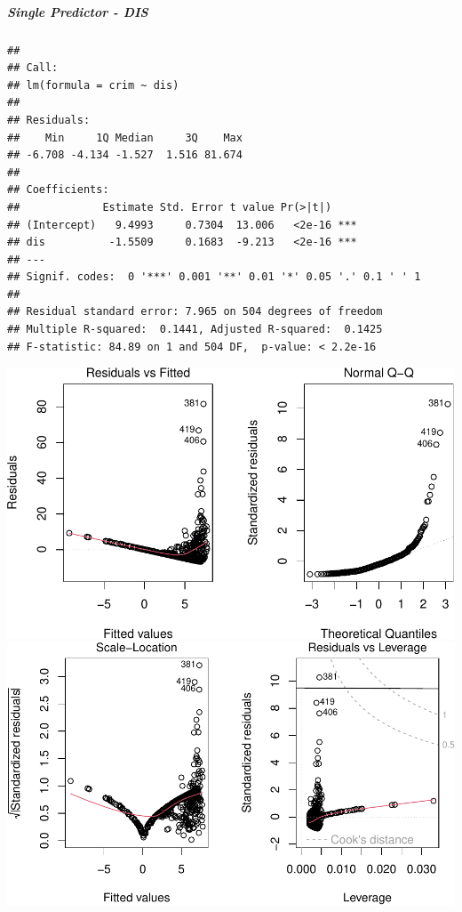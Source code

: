 \documentclass[
]{article}
\begin{document}
\hypertarget{single-predictor---dis}{%
\subparagraph{\texorpdfstring{\textbf{Single Predictor -
DIS}}{Single Predictor - DIS}}\label{single-predictor---dis}}

\begin{verbatim}
## 
## Call:
## lm(formula = crim ~ dis)
## 
## Residuals:
##    Min     1Q Median     3Q    Max 
## -6.708 -4.134 -1.527  1.516 81.674 
## 
## Coefficients:
##             Estimate Std. Error t value Pr(>|t|)    
## (Intercept)   9.4993     0.7304  13.006   <2e-16 ***
## dis          -1.5509     0.1683  -9.213   <2e-16 ***
## ---
## Signif. codes:  0 '***' 0.001 '**' 0.01 '*' 0.05 '.' 0.1 ' ' 1
## 
## Residual standard error: 7.965 on 504 degrees of freedom
## Multiple R-squared:  0.1441, Adjusted R-squared:  0.1425 
## F-statistic: 84.89 on 1 and 504 DF,  p-value: < 2.2e-16
\end{verbatim}

\includegraphics{Disha_Gandhi_Take_Home_Exam_PDF_files/figure-latex/unnamed-chunk-24-1.pdf}
\includegraphics{Disha_Gandhi_Take_Home_Exam_PDF_files/figure-latex/unnamed-chunk-24-2.pdf}
\end{document}
